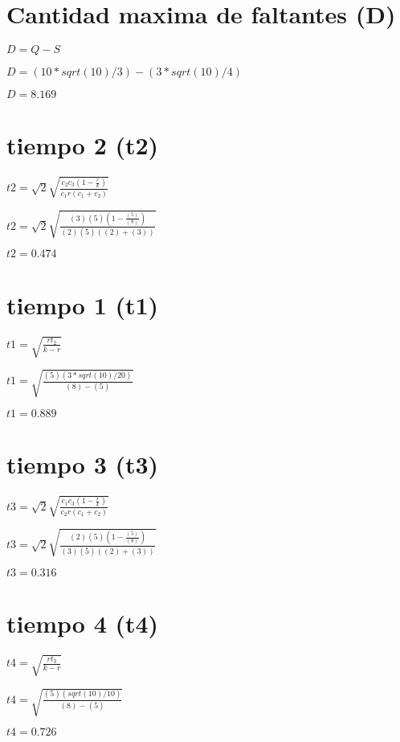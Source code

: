 \documentclass{article}
\newcommand*\rbreak{\par\noindent\linebreak}
\begin{document}
\section{\Huge Cantidad maxima de faltantes (D)}
\begin{huge}
$D = Q - S$\rbreak
$D =  (10*sqrt(10)/3)  -  (3*sqrt(10)/4) $\rbreak
$D = 8.169$
\end{huge}
\section{\Huge tiempo 2 (t2)}
\begin{huge}
$t2 = \sqrt{2} \sqrt{\frac{c_{2} c_{3} \left(1 - \frac{r}{k}\right)}{c_{1} r \left(c_{1} + c_{2}\right)}}$\rbreak
$t2 = \sqrt{2} \sqrt{\frac{(3) (5) \left(1 - \frac{ (5) }{ (8) }\right)}{(2)  (5)  \left((2) + (3)\right)}}$\rbreak
$t2 = 0.474$
\end{huge}
\section{\Huge tiempo 1 (t1)}
\begin{huge}
$t1 = \sqrt{\frac{r t_{2}}{k - r}}$\rbreak
$t1 = \sqrt{\frac{ (5)  (3*sqrt(10)/20)}{ (8)  -  (5) }}$\rbreak
$t1 = 0.889$
\end{huge}
\section{\Huge tiempo 3 (t3)}
\begin{huge}
$t3 = \sqrt{2} \sqrt{\frac{c_{1} c_{3} \left(1 - \frac{r}{k}\right)}{c_{2} r \left(c_{1} + c_{2}\right)}}$\rbreak
$t3 = \sqrt{2} \sqrt{\frac{(2) (5) \left(1 - \frac{ (5) }{ (8) }\right)}{(3)  (5)  \left((2) + (3)\right)}}$\rbreak
$t3 = 0.316$
\end{huge}
\section{\Huge tiempo 4 (t4)}
\begin{huge}
$t4 = \sqrt{\frac{r t_{3}}{k - r}}$\rbreak
$t4 = \sqrt{\frac{ (5)  (sqrt(10)/10)}{ (8)  -  (5) }}$\rbreak
$t4 = 0.726$
\end{huge}
\end{document}
